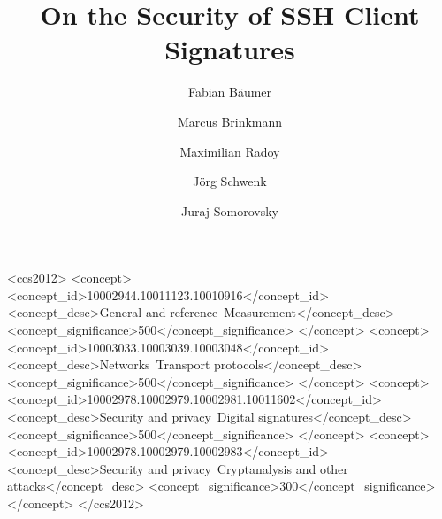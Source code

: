 \documentclass[sigconf]{acmart}
\begin{document}
\title{On the Security of SSH Client Signatures}

\author{Fabian B{\"a}umer}

\author{Marcus Brinkmann}

\author{Maximilian Radoy}

\author{J{\"o}rg Schwenk}

\author{Juraj Somorovsky}

\renewcommand{\shortauthors}{Fabian Bäumer, Marcus Brinkmann, Maximilian Radoy, Jörg Schwenk, and Juraj Somorovsky}

\begin{abstract}
  
\end{abstract}

\begin{CCSXML}
<ccs2012>
   <concept>
       <concept_id>10002944.10011123.10010916</concept_id>
       <concept_desc>General and reference~Measurement</concept_desc>
       <concept_significance>500</concept_significance>
       </concept>
   <concept>
       <concept_id>10003033.10003039.10003048</concept_id>
       <concept_desc>Networks~Transport protocols</concept_desc>
       <concept_significance>500</concept_significance>
       </concept>
   <concept>
       <concept_id>10002978.10002979.10002981.10011602</concept_id>
       <concept_desc>Security and privacy~Digital signatures</concept_desc>
       <concept_significance>500</concept_significance>
       </concept>
   <concept>
       <concept_id>10002978.10002979.10002983</concept_id>
       <concept_desc>Security and privacy~Cryptanalysis and other attacks</concept_desc>
       <concept_significance>300</concept_significance>
       </concept>
 </ccs2012>
\end{CCSXML}

\end{document}
